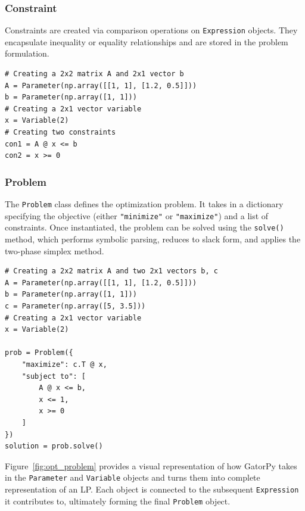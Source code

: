 \documentclass[conference]{IEEEtran}
\begin{document}
\subsubsection{Constraint} Constraints are created via comparison operations on \texttt{Expression} objects. 
They encapsulate inequality or equality relationships and are stored in the problem formulation. 

\begin{lstlisting}[style=mypython]
# Creating a 2x2 matrix A and 2x1 vector b
A = Parameter(np.array([[1, 1], [1.2, 0.5]])) 
b = Parameter(np.array([1, 1])) 
# Creating a 2x1 vector variable
x = Variable(2) 
# Creating two constraints
con1 = A @ x <= b 
con2 = x >= 0 
\end{lstlisting}



\subsubsection{Problem} The \texttt{Problem} class defines the optimization problem. 
It takes in a dictionary specifying the objective (either \texttt{"minimize"} or \texttt{"maximize"}) and a list of constraints. 
Once instantiated, the problem can be solved using the \texttt{solve()} method, which performs symbolic parsing, reduces to slack form, and applies the two-phase simplex method.

\begin{lstlisting}[style=mypython, label={lst:example_problem}] 
# Creating a 2x2 matrix A and two 2x1 vectors b, c
A = Parameter(np.array([[1, 1], [1.2, 0.5]])) 
b = Parameter(np.array([1, 1]))
c = Parameter(np.array([5, 3.5])) 
# Creating a 2x1 vector variable
x = Variable(2) 
    
prob = Problem({ 
    "maximize": c.T @ x, 
    "subject to": [
        A @ x <= b, 
        x <= 1, 
        x >= 0
    ] 
}) 
solution = prob.solve() 
\end{lstlisting}

Figure~\ref{fig:opt_problem} provides a visual representation of how GatorPy takes in the \texttt{Parameter} and \texttt{Variable} objects and turns them into complete representation of an LP.
Each object is connected to the subsequent \texttt{Expression} it contributes to, ultimately forming the final \texttt{Problem} object.
\end{document}
